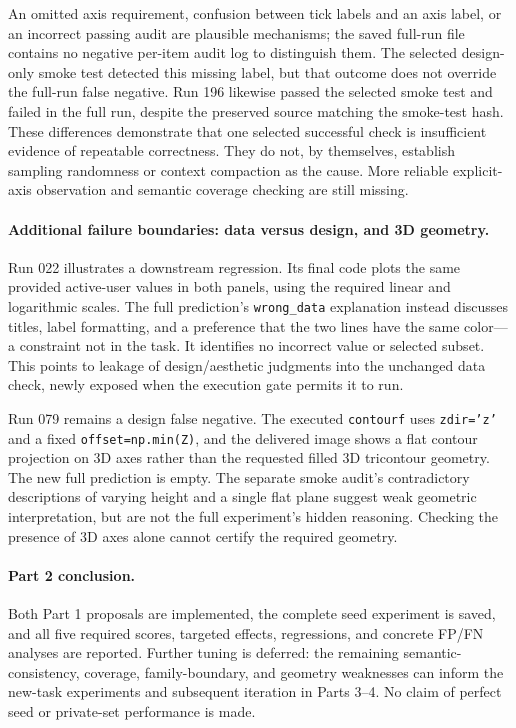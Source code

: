 \documentclass[11pt]{article}
\begin{document}
An omitted axis requirement, confusion between tick labels and an axis label,
or an incorrect passing audit are plausible mechanisms; the saved full-run
file contains no negative per-item audit log to distinguish them.
The selected design-only smoke test detected this missing label, but that
outcome does not override the full-run false negative.
Run 196 likewise passed the selected smoke test and failed in the full run,
despite the preserved source matching the smoke-test hash. These differences
demonstrate that one selected successful check is insufficient evidence of
repeatable correctness. They do not, by themselves, establish sampling
randomness or context compaction as the cause.
More reliable explicit-axis observation and semantic coverage checking are
still missing.

\paragraph{Additional failure boundaries: data versus design, and 3D geometry.}
Run 022 illustrates a downstream regression. Its final code plots the same
provided active-user values in both panels, using the required linear and
logarithmic scales. The full prediction's \texttt{wrong\_data} explanation
instead discusses titles, label formatting, and a preference that the two
lines have the same color---a constraint not in the task. It identifies no
incorrect value or selected subset. This points to leakage of design/aesthetic
judgments into the unchanged data check, newly exposed when the execution
gate permits it to run.

Run 079 remains a design false negative. The executed
\texttt{contourf} uses \texttt{zdir='z'} and a fixed
\texttt{offset=np.min(Z)}, and the delivered image shows a flat contour
projection on 3D axes rather than the requested filled 3D tricontour geometry.
The new full prediction is empty.
The separate smoke audit's contradictory descriptions of varying height and
a single flat plane suggest weak geometric interpretation, but are not the
full experiment's hidden reasoning. Checking the presence of 3D axes alone
cannot certify the required geometry.

\paragraph{Part 2 conclusion.}
Both Part 1 proposals are implemented, the complete seed experiment is saved,
and all five required scores, targeted effects, regressions, and concrete
FP/FN analyses are reported. Further tuning is deferred: the remaining
semantic-consistency, coverage, family-boundary, and geometry weaknesses can
inform the new-task experiments and subsequent iteration in Parts 3--4.
No claim of perfect seed or private-set performance is made.
\end{document}
